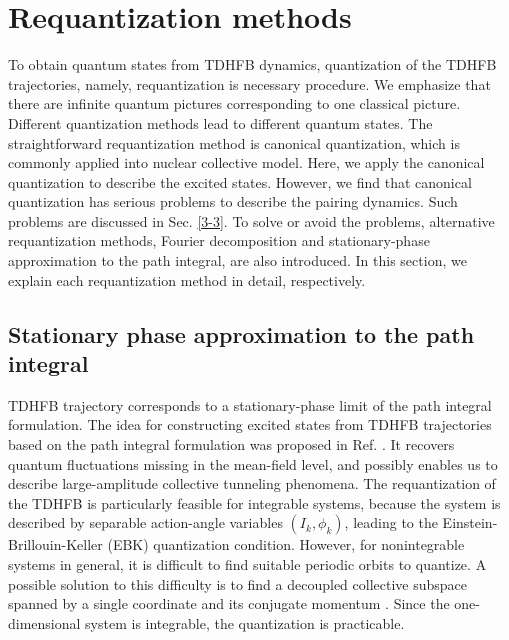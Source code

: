 \documentclass[11pt]{book} %
\begin{document}
\section{Requantization methods}
\label{3-2}
To obtain quantum states from TDHFB dynamics, quantization of the TDHFB trajectories, namely, requantization is necessary procedure. We emphasize that there are infinite quantum pictures corresponding to one classical picture. Different quantization methods lead to different quantum states. The straightforward requantization method is canonical quantization, which is commonly applied into nuclear collective model. Here, we apply the canonical quantization to describe the excited states. However, we find that canonical quantization has serious problems to describe the pairing dynamics. Such problems are discussed in Sec. \ref{3-3}. To solve or avoid the problems, alternative requantization methods, Fourier decomposition and stationary-phase approximation to the path integral, are also introduced. In this section, we explain each requantization method in detail, respectively.

\subsection{Stationary phase approximation to the path integral}
TDHFB trajectory corresponds to a stationary-phase limit of the path integral formulation. The idea for constructing excited states from TDHFB trajectories based on the path integral formulation was proposed in Ref. \cite{Neg82,L80,LNP80,KS80,K81,Rei80}. 
It recovers quantum fluctuations missing in the mean-field
level, and possibly enables us to describe large-amplitude collective
tunneling phenomena.
The requantization of the TDHFB is particularly feasible
for integrable systems, because the system is described by separable
action-angle variables $(I_k, \phi_k)$, leading to
the Einstein-Brillouin-Keller (EBK) quantization condition.
However, for nonintegrable systems in general, it is difficult to find
suitable periodic orbits to quantize.
A possible solution to this difficulty is to find a decoupled collective
subspace spanned by
a single coordinate and its conjugate momentum \cite{NMMY16}.
Since the one-dimensional system is integrable, the quantization is
practicable.
\end{document}
